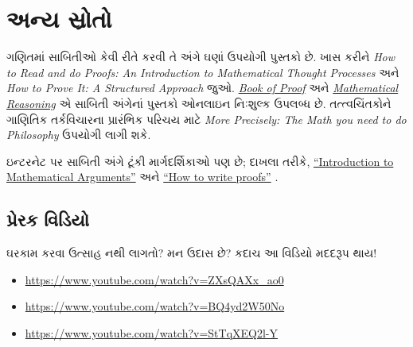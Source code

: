 \section{અન્ય સ્રોતો}
\label{guunit:OLP-0612}


ગણિતમાં સાબિતીઓ કેવી રીતે કરવી તે અંગે ઘણાં ઉપયોગી પુસ્તકો
છે. ખાસ કરીને \emph{How to Read and do Proofs: An Introduction to
Mathematical Thought Processes} \citep{Solow2013} અને \emph{How to
Prove It: A Structured Approach} \citep{Velleman2019} જુઓ.
\href{http://www.people.vcu.edu/~rhammack/BookOfProof/BookOfProof.pdf}{\emph{Book
of Proof}} \citep{Hammack2013} અને
\href{https://scholarworks.gvsu.edu/books/7/}{\emph{Mathematical
Reasoning}} \citep{Sandstrum2019} એ સાબિતી અંગેનાં પુસ્તકો
ઓનલાઇન નિઃશુલ્ક ઉપલબ્ધ છે. તત્ત્વચિંતકોને ગાણિતિક તર્કવિચારના
પ્રારંભિક પરિચય માટે
\emph{More
Precisely: The Math you need to do Philosophy} \citep{Steinhart2018}
ઉપયોગી લાગી શકે.

ઇન્ટરનેટ પર સાબિતી અંગે ટૂંકી માર્ગદર્શિકાઓ પણ છે;
દાખલા તરીકે,
\href{https://math.berkeley.edu/~hutching/teach/proofs.pdf}{``Introduction
  to Mathematical Arguments''} \citep{Hutchings2003} અને
\href{https://eugeniacheng.com/wp-content/uploads/2017/02/cheng-proofguide.pdf}{``How to
  write proofs''} \citep{Cheng2004}.

\subsection{પ્રેરક વિડિયો}

ઘરકામ કરવા ઉત્સાહ નથી લાગતો? મન ઉદાસ છે? કદાચ આ વિડિયો
મદદરૂપ થાય!

\begin{itemize}
\item \url{https://www.youtube.com/watch?v=ZXsQAXx_ao0}
\item \url{https://www.youtube.com/watch?v=BQ4yd2W50No}
\item \url{https://www.youtube.com/watch?v=StTqXEQ2l-Y}
\end{itemize}
\endgroup


\OLEndChapterHook
\endgroup


\begingroup
\makeatletter{}\makeatother

\label{guunit:OLP-0613}


\begingroup
\makeatletter{}\makeatother


